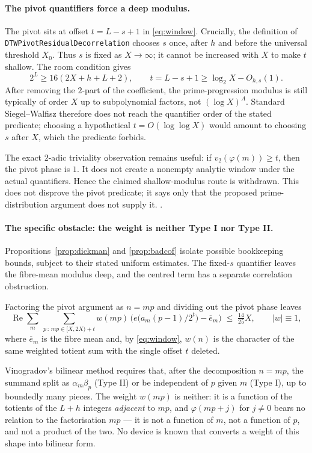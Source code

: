 \paragraph{The pivot quantifiers force a deep modulus.}
The pivot sits at offset $t=L-s+1$ in \eqref{eq:window}.  Crucially, the
definition of \texttt{DTWPivotResidualDecorrelation} chooses $s$ once, after
$h$ and before the universal threshold $X_0$.  Thus $s$ is fixed as
$X\to\infty$; it cannot be increased with $X$ to make $t$ shallow.  The room
condition gives
\[
  2^L\ge16(2X+h+L+2),\qquad
  t=L-s+1\ge\log_2X-O_{h,s}(1).
\]
After removing the $2$-part of the coefficient, the prime-progression modulus
is still typically of order $X$ up to subpolynomial factors, not
$(\log X)^A$.  Standard Siegel--Walfisz therefore does not reach the
quantifier order of the stated predicate; choosing a hypothetical
$t=O(\log\log X)$ would amount to choosing $s$ after $X$, which the predicate
forbids.

The exact $2$-adic triviality observation remains useful: if
$v_2(\varphi(m))\ge t$, then the pivot phase is $1$.  It does not create a
nonempty analytic window under the actual quantifiers.  Hence the claimed
shallow-modulus route is withdrawn.  This does not disprove the pivot
predicate; it says only that the proposed prime-distribution argument does
not supply it.  .

\paragraph{The specific obstacle: the weight is neither Type I nor Type II.}
Propositions~\ref{prop:dickman} and \ref{prop:badcof} isolate possible
bookkeeping bounds, subject to their stated uniform estimates.  The
fixed-$s$ quantifier leaves the fibre-mean modulus deep, and the centred term
has a separate correlation obstruction.

Factoring the pivot argument as
$n=mp$ and dividing out the pivot phase leaves
\[
  \operatorname{Re}\sum_{m}\ \sum_{p\,:\,mp\in[X,2X)+t}
    w(mp)\,\bigl(e\bigl(a_m(p-1)/2^{t}\bigr)-\overline{e}_m\bigr)
  \;\le\;\tfrac{14}{25}X ,
  \qquad |w|\equiv 1 ,
\]
where $\overline{e}_m$ is the fibre mean and, by \eqref{eq:window}, $w(n)$ is
the character of the same weighted totient sum with the single offset $t$
deleted.

Vinogradov's bilinear method requires that, after the decomposition
$n=mp$, the summand split as $\alpha_m\beta_p$ (Type II) or be independent of
$p$ given $m$ (Type I), up to boundedly many pieces. The weight $w(mp)$ is
neither: it is a function of the totients of the $L+h$ integers
\emph{adjacent} to $mp$, and $\varphi(mp+j)$ for $j\ne0$ bears no relation to
the factorisation $mp$ --- it is not a function of $m$, not a function of
$p$, and not a product of the two. No device is known that converts a weight
of this shape into bilinear form.


